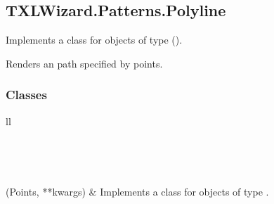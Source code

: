 \documentclass[letterpaper,10pt,english]{sphinxmanual}
\begin{document}
\subsection{TXLWizard.Patterns.Polyline}
\label{Chapters/PythonModuleReference/Patterns/TXLWizard.Patterns.Polyline:module-TXLWizard.Patterns.Polyline}\label{Chapters/PythonModuleReference/Patterns/TXLWizard.Patterns.Polyline::doc}\label{Chapters/PythonModuleReference/Patterns/TXLWizard.Patterns.Polyline:txlwizard-patterns-polyline}
Implements a class for  objects of type  ().

Renders an path specified by points.


\subsubsection{Classes}
\label{Chapters/PythonModuleReference/Patterns/TXLWizard.Patterns.Polyline:classes}
\begin{longtable}{ll}
\hline
\endfirsthead

%
{{}} \\
\hline
\endhead

\hline {} \\ \hline
\endfoot

\endlastfoot


{\hyperref[Chapters/PythonModuleReference/Patterns/TXLWizard.Patterns.Polyline:TXLWizard.Patterns.Polyline.Polyline]{}}(Points, **kwargs)
 & 
Implements a class for  objects of type .
\\
\hline\end{longtable}

\end{document}
